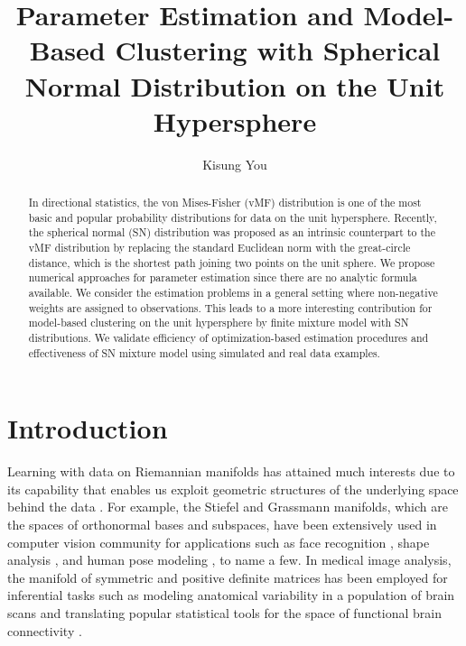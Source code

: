 \documentclass[11pt]{article}
\begin{document}
	
\title{Parameter Estimation and Model-Based Clustering with Spherical Normal Distribution on the Unit Hypersphere}
\author[1]{Kisung You}
\date{}

\maketitle
\begin{abstract}
In directional statistics, the von Mises-Fisher (vMF) distribution is one of the most basic and popular probability distributions for data on the unit hypersphere. Recently, the spherical normal (SN) distribution was proposed as an intrinsic counterpart to the vMF distribution by replacing the standard Euclidean norm with the great-circle distance, which is the shortest path joining two points on the unit sphere. We propose numerical approaches for parameter estimation since there are no analytic formula available. We consider the estimation problems in a general setting where non-negative weights are assigned to observations. This leads to a more interesting contribution for model-based clustering on the unit hypersphere by finite mixture model with SN distributions. We validate efficiency of optimization-based estimation procedures and effectiveness of SN mixture model using simulated and real data examples. 
\end{abstract}



\section{Introduction}\label{sec:intro}


Learning with data on Riemannian manifolds has attained much interests due to its capability that enables us exploit geometric structures of the underlying space behind the data \citep{bhattacharya_nonparametric_2012-1, patrangenaru_nonparametric_2016, pennec_riemannian_2020}. For example, the Stiefel and Grassmann manifolds, which are the spaces of orthonormal bases and subspaces, have been extensively used in computer vision community for applications such as face recognition \citep{aggarwal_system_2004}, shape analysis \citep{goodall_projective_1999}, and human pose modeling \citep{bissacco_recognition_2001}, to name a few. In medical image analysis, the manifold of symmetric and positive definite matrices has been employed for inferential tasks such as modeling anatomical variability in a population of brain scans \citep{fletcher_geometric_2009-1} and translating popular statistical tools for the space of functional brain connectivity \citep{you_re-visiting_2021}. 
\end{document}
